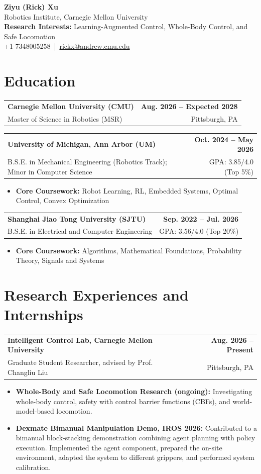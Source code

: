 \documentclass[11pt,letterpaper]{article}
\makeatletter
\newcommand{\resumeSubheading}[4]{
    \begin{tabularx}{\textwidth}{@{}Xr@{}}
        \textbf{#1} & \textbf{#2} \\
        #3 & #4 \\
    \end{tabularx}
}
\newcommand{\resumeItem}[1]{
    \item #1
}
\makeatother
\begin{document}
\begin{center}
    {\LARGE \textbf{Ziyu (Rick) Xu}} \\[2pt]
    {\small Robotics Institute, Carnegie Mellon University} \\[1pt]
    {\small \textbf{Research Interests:} Learning-Augmented Control, Whole-Body Control, and Safe Locomotion} \\[1pt]
    {\small
    +1 7348005258
    \,|\, 
    \href{mailto:rickx@andrew.cmu.edu}{rickx@andrew.cmu.edu}
    } \\[1pt]
\end{center}

\section*{Education}
\resumeSubheading
{Carnegie Mellon University (CMU)}
{Aug. 2026 -- Expected 2028}
{\hspace*{1.4em}Master of Science in Robotics (MSR)}
{Pittsburgh, PA}
\resumeSubheading
{University of Michigan, Ann Arbor (UM)}
{Oct. 2024 -- May 2026}
{\hspace*{1.4em}B.S.E. in Mechanical Engineering (Robotics Track); Minor in Computer Science}
{GPA: 3.85/4.0 (Top 5\%)}
\begin{itemize}[leftmargin=2.4em, itemsep=0.5pt, topsep=0pt]
    \item \textbf{Core Coursework:} Robot Learning, RL, Embedded Systems, Optimal Control, Convex Optimization
\end{itemize}

\resumeSubheading
{Shanghai Jiao Tong University (SJTU)}
{Sep. 2022 -- Jul. 2026}
{\hspace*{1.4em}B.S.E. in Electrical and Computer Engineering}
{GPA: 3.56/4.0 (Top 20\%)}
\begin{itemize}[leftmargin=2.4em, itemsep=0.5pt, topsep=0pt]
    \item \textbf{Core Coursework:} Algorithms, Mathematical Foundations, Probability Theory, Signals and Systems
\end{itemize}
\section*{Research Experiences and Internships}
\resumeSubheading
{Intelligent Control Lab, Carnegie Mellon University}
{Aug. 2026 -- Present}
{\hspace*{1.4em}Graduate Student Researcher, advised by Prof. Changliu Liu}
{Pittsburgh, PA}
\begin{itemize}[leftmargin=2.4em, itemsep=0.5pt, topsep=0pt]
\small
\resumeItem{\textbf{Whole-Body and Safe Locomotion Research (ongoing):} Investigating whole-body control, safety with control barrier functions (CBFs), and world-model-based locomotion.}
\resumeItem{\textbf{Dexmate Bimanual Manipulation Demo, IROS 2026:} Contributed to a bimanual block-stacking demonstration combining agent planning with policy execution. Implemented the agent component, prepared the on-site environment, adapted the system to different grippers, and performed system calibration.}
\end{itemize}
\end{document}
